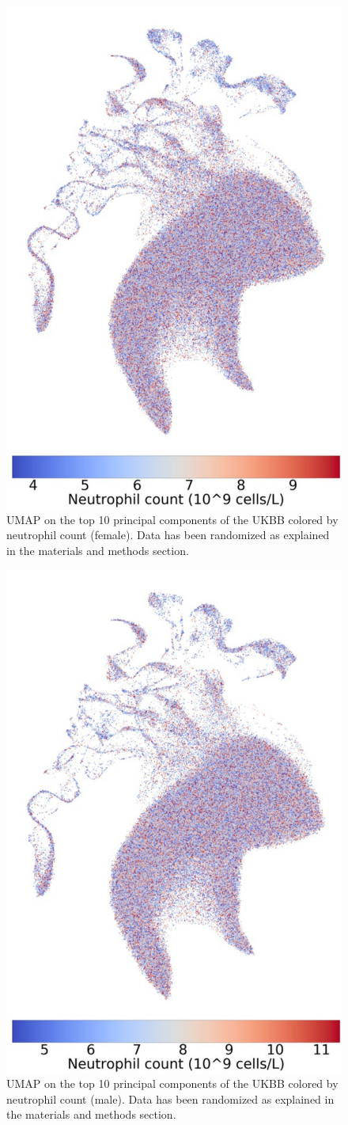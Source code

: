 \documentclass[12pt]{pnas-new}
\begin{document}
\begin{figure}
    \centering
    \includegraphics[width=0.4\columnwidth]{images/UKBB_UMAP_PC10_NN15_MD05_2018328174511_2018714165614_neutrophill_count_pct5_f.pdf}
    \caption{UMAP on the top 10 principal components of the UKBB colored by neutrophil count (female). Data has been randomized as explained in the materials and methods section.}
    \label{fig:supp_ukbb_neutrophill_f}
\end{figure}

\begin{figure}
    \centering
    \includegraphics[width=0.4\columnwidth]{images/UKBB_UMAP_PC10_NN15_MD05_2018328174511_2018714165614_neutrophill_count_pct5_m.pdf}
    \caption{UMAP on the top 10 principal components of the UKBB colored by neutrophil count (male). Data has been randomized as explained in the materials and methods section.}
    \label{fig:supp_ukbb_neutrophill_m}
\end{figure}
\end{document}
